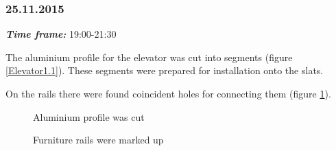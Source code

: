 \subsubsection{25.11.2015}
\textit{\textbf{Time frame:}} 19:00-21:30 

The aluminium profile for the elevator was cut into segments (figure \ref{Elevator1.1}). These segments were prepared for installation onto the slats.

On the rails there were found coincident holes for connecting them (figure \ref{Elevator1.2}).

\begin{figure}[H]
	\begin{minipage}[h]{0.47\linewidth}
		\caption{Aluminium profile was cut}
		\label{Elevator1.1}
	\end{minipage}
	\hfill
	\begin{minipage}[h]{0.47\linewidth}
		\caption{Furniture rails were marked up}
		\label{Elevator1.2}
	\end{minipage}
\end{figure}

